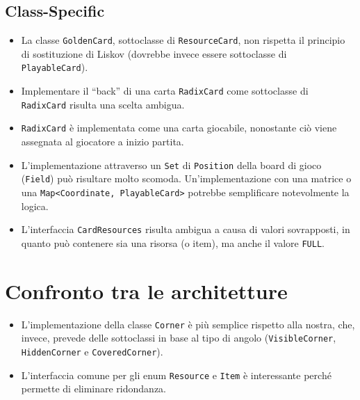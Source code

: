\documentclass{article}
\begin{document}
\subsection{Class-Specific}

\begin{itemize}
  \item La classe \texttt{GoldenCard}, sottoclasse di \texttt{ResourceCard}, non rispetta il principio di sostituzione di Liskov (dovrebbe invece essere sottoclasse di \\\texttt{PlayableCard}).
  \item Implementare il ``back'' di una carta \texttt{RadixCard} come sottoclasse di \texttt{RadixCard} risulta una scelta ambigua.
  \item \texttt{RadixCard} è implementata come una carta giocabile, nonostante ciò viene assegnata al giocatore a inizio partita.
  \item L'implementazione attraverso un \texttt{Set} di \texttt{Position} della board di gioco (\texttt{Field}) può risultare molto scomoda.
  Un'implementazione con una matrice o una \texttt{Map<Coordinate, PlayableCard>} potrebbe semplificare notevolmente la logica.
  \item L'interfaccia \texttt{CardResources} risulta ambigua a causa di valori sovrapposti, in quanto può contenere sia una risorsa (o item), ma anche il valore \texttt{FULL}.
\end{itemize}

\section{Confronto tra le architetture}

\begin{itemize}
  \item L'implementazione della classe \texttt{Corner} è più semplice rispetto alla nostra, che, invece, prevede delle sottoclassi in base al tipo di angolo (\texttt{VisibleCorner}, \texttt{HiddenCorner} e \texttt{CoveredCorner}).
  \item L'interfaccia comune per gli enum \texttt{Resource} e \texttt{Item} è interessante perché permette di eliminare ridondanza.
\end{itemize}
\end{document}
